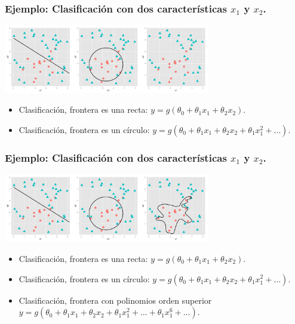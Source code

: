 \documentclass{beamer}
\begin{document}
    \begin{frame}\frametitle{Ejemplo: Clasificación con dos características $x_1$ y $x_2$.}
   \begin{overlayarea}{\textwidth}{8cm} 
 \begin{center}
   \includegraphics[height=3cm]{decisionboundaries-110.png}
 \end{center}
     \begin{itemize}
 \item Clasificación, frontera es una  recta: $y=g(\theta_0+\theta_1x_1+\theta_2x_2)$.
    \item Clasificación, frontera es un círculo: $y=g(\theta_0+\theta_1x_1+\theta_2x_2+\theta_1x_1^2+\ldots)$.
 \end{itemize}

   \end{overlayarea}

 \end{frame}
      \begin{frame}\frametitle{Ejemplo: Clasificación con dos características $x_1$ y $x_2$.}
   \begin{overlayarea}{\textwidth}{8cm} 
 \begin{center}
   \includegraphics[height=3cm]{decisionboundaries-111.png}
 \end{center}
     \begin{itemize}
 \item Clasificación, frontera es una  recta: $y=g(\theta_0+\theta_1x_1+\theta_2x_2)$.
       \item Clasificación, frontera es un círculo: $y=g(\theta_0+\theta_1x_1+\theta_2x_2+\theta_1x_1^2+\ldots)$.
\item Clasificación, frontera con polinomios orden superior $y=g(\theta_0+\theta_1x_1+\theta_2x_2+\theta_1x_1^2+\ldots+\theta_1x_1^6+\ldots)$.
 \end{itemize}

   \end{overlayarea}

 \end{frame}
\end{document}
